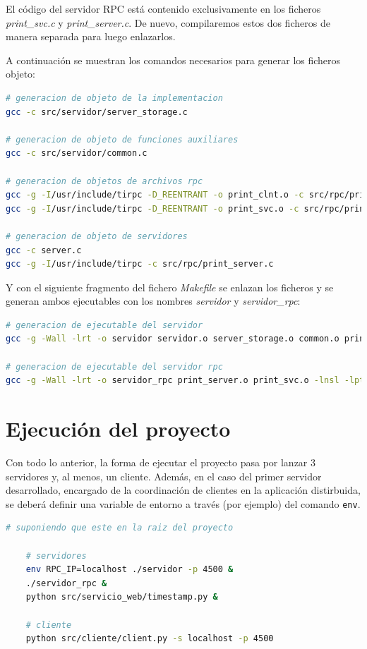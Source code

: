 \documentclass[]{article}
\begin{document}
El código del servidor RPC está contenido exclusivamente en los ficheros \textit{print\_svc.c} y \textit{print\_server.c}. De nuevo, compilaremos estos dos ficheros de manera separada para luego enlazarlos.

A continuación se muestran los comandos necesarios para generar los ficheros objeto:

\begin{lstlisting}[caption=Compilación de ficheros en ficheros objetos, language=bash]
# generacion de objeto de la implementacion
gcc -c src/servidor/server_storage.c

# generacion de objeto de funciones auxiliares
gcc -c src/servidor/common.c

# generacion de objetos de archivos rpc
gcc -g -I/usr/include/tirpc -D_REENTRANT -o print_clnt.o -c src/rpc/print_clnt.c
gcc -g -I/usr/include/tirpc -D_REENTRANT -o print_svc.o -c src/rpc/print_svc.c

# generacion de objeto de servidores
gcc -c server.c
gcc -g -I/usr/include/tirpc -c src/rpc/print_server.c

\end{lstlisting}

Y con el siguiente fragmento del fichero \textit{Makefile} se enlazan los ficheros y se generan ambos ejecutables con los nombres \textit{servidor} y \textit{servidor\_rpc}:

\begin{lstlisting}[caption=Generación de ejecutables, language=bash]
# generacion de ejecutable del servidor
gcc -g -Wall -lrt -o servidor servidor.o server_storage.o common.o print_clnt.o -lnsl -lpthread -ldl -ltirpc

# generacion de ejecutable del servidor rpc
gcc -g -Wall -lrt -o servidor_rpc print_server.o print_svc.o -lnsl -lpthread -ldl -ltirpc

\end{lstlisting}


\section{Ejecución del proyecto}
\label{sec:exec}
Con todo lo anterior, la forma de ejecutar el proyecto pasa por lanzar 3 servidores y, al menos, un cliente. Además, en el caso del primer servidor desarrollado, encargado de la coordinación de clientes en la aplicación distirbuida, se deberá definir una variable de entorno a través (por ejemplo) del comando \texttt{env}.

\begin{lstlisting}[caption=Ejemplo de ejecucion con los servidores en background y en local, language=bash]
    # suponiendo que este en la raiz del proyecto
    
    # servidores
    env RPC_IP=localhost ./servidor -p 4500 &
    ./servidor_rpc & 
    python src/servicio_web/timestamp.py &

    # cliente
    python src/cliente/client.py -s localhost -p 4500

\end{lstlisting}
\end{document}
